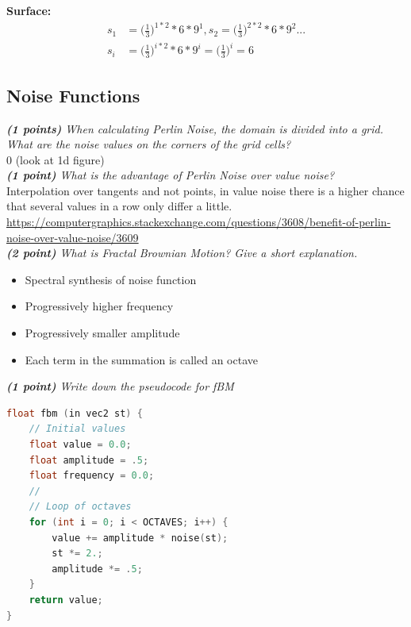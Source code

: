 \documentclass[a4paper,10pt]{article}
\begin{document}
\textbf{Surface:}
\[
\begin{aligned}
s_1&=\Big(\frac{1}{3}\Big)^{1*2}*6*9^1,s_2=\Big(\frac{1}{3}\Big)^{2*2}*6*9^2...\\
s_i&=\Big(\frac{1}{3}\Big)^{i*2}*6*9^i=\Big(\frac{1}{3}\Big)^{i}=6
\end{aligned}
\]
\subsection{Noise Functions}
\textit{\textbf{(1 points)} When calculating Perlin Noise, the domain is divided into a grid. What are the noise values on the corners of the grid cells?}\\

0 (look at 1d figure)\\

\textit{\textbf{(1 point)} What is the advantage of Perlin Noise over value noise?}\\

Interpolation over tangents and not points, in value noise there is a higher chance that several values in a row
only differ a little. \\

\url{https://computergraphics.stackexchange.com/questions/3608/benefit-of-perlin-noise-over-value-noise/3609}\\

\textit{\textbf{(2 point)} What is Fractal Brownian Motion? Give a short explanation.}

 \begin{itemize}
 	\item Spectral synthesis of noise function
 	\item Progressively higher frequency
 	\item Progressively smaller amplitude
 	\item Each term in the summation is called an octave
 \end{itemize}
\textit{\textbf{(1 point)} Write down the pseudocode for fBM}
\begin{lstlisting}[language=C]
float fbm (in vec2 st) {
	// Initial values
	float value = 0.0;
	float amplitude = .5;
	float frequency = 0.0;
	//
	// Loop of octaves
	for (int i = 0; i < OCTAVES; i++) {
		value += amplitude * noise(st);
		st *= 2.;
		amplitude *= .5;
	}
	return value;
}
\end{lstlisting}
\end{document}
